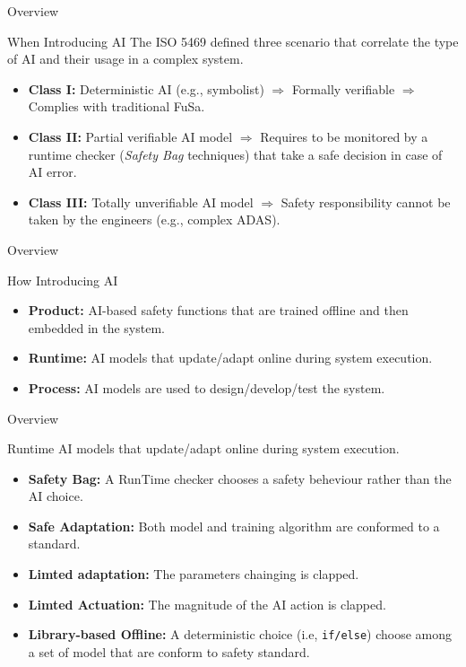 \begin{frame}{Overview}
    \begin{block}{When Introducing AI}
        The ISO 5469 defined three scenario that correlate the type of AI and their usage in a complex system.
        \begin{itemize}
            \item \textbf{Class I:} Deterministic AI (e.g., symbolist) $\Rightarrow$ Formally verifiable $\Rightarrow$ Complies with traditional FuSa.
            \item \textbf{Class II:} Partial verifiable AI model $\Rightarrow$ Requires to be monitored by a runtime checker (\textit{Safety Bag} techniques) that take a safe decision in case of AI error.
            \item \textbf{Class III:} Totally unverifiable AI model $\Rightarrow$ Safety responsibility cannot be taken by the engineers (e.g., complex ADAS).
        \end{itemize}
    \end{block}
\end{frame}

\begin{frame}{Overview}
    \begin{block}{How Introducing AI}
        \begin{itemize}
            \item \textbf{Product:} AI-based safety functions that are trained offline and then embedded in the system.
            \item \textbf{Runtime:} AI models that update/adapt online during system execution.
            \item \textbf{Process:} AI models are used to design/develop/test the system.
        \end{itemize}
    \end{block}
\end{frame}

\begin{frame}{Overview}
    \begin{block}{Runtime}
        AI models that update/adapt online during system execution.
        \begin{itemize}
            \item \textbf{Safety Bag:} A RunTime checker chooses a safety beheviour rather than the AI choice.
            \item \textbf{Safe Adaptation:} Both model and training algorithm are conformed to a standard.
            \item \textbf{Limted adaptation:} The parameters chainging is clapped.
            \item \textbf{Limted Actuation:} The magnitude of the AI action is clapped.
            \item \textbf{Library-based Offline:} A deterministic choice (i.e, \texttt{if/else}) choose among a set of model that are conform to safety standard.
        \end{itemize}
    \end{block}
\end{frame}